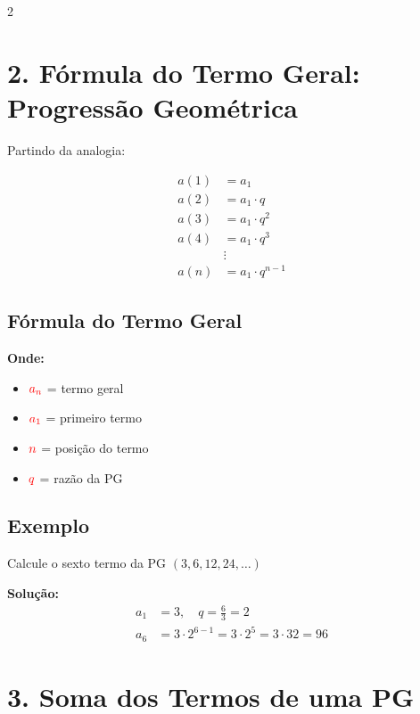 \documentclass[11pt]{article}
\begin{document}
\begin{multicols}{2}
\section*{2. Fórmula do Termo Geral: Progressão Geométrica}
Partindo da analogia:

\begin{align*}
a(1) &= a_1 \\
a(2) &= a_1 \cdot q \\
a(3) &= a_1 \cdot q^2 \\
a(4) &= a_1 \cdot q^3 \\
&\vdots \\
a(n) &= a_1 \cdot q^{n-1}
\end{align*}

\subsection*{Fórmula do Termo Geral}


\vspace{5mm}

\textbf{Onde:}
\begin{itemize}
\item $\textcolor{red}{a_n}$ = termo geral
\item $\textcolor{red}{a_1}$ = primeiro termo
\item $\textcolor{red}{n}$ = posição do termo
\item $\textcolor{red}{q}$ = razão da PG
\end{itemize}

\subsection*{Exemplo}
Calcule o sexto termo da PG $(3, 6, 12, 24, \ldots)$

\textbf{Solução:}
\begin{align*}
a_1 &= 3,\quad q = \frac{6}{3} = 2 \\
a_6 &= 3 \cdot 2^{6-1} = 3 \cdot 2^5 = 3 \cdot 32 = 96
\end{align*}

\section*{3. Soma dos Termos de uma PG}


\end{multicols}
\end{document}
